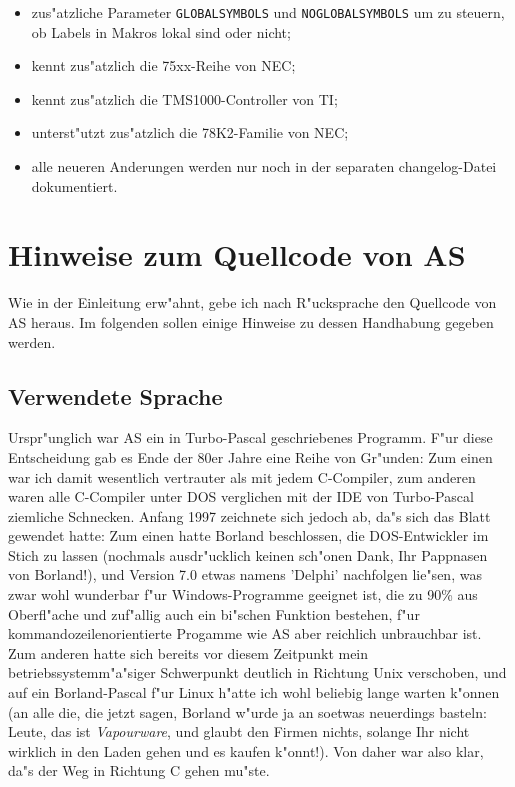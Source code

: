 \documentclass[12pt,a4paper,twoside]{report}
\newcommand{\tty}[1]{{\tt #1}}
\newcommand{\asname}{AS}
\begin{document}
\begin{itemize}
{\begin{itemize}
      \item{zus"atzliche Parameter \tty{GLOBALSYMBOLS} und
            \tty{NOGLOBALSYMBOLS} um zu steuern, ob Labels
            in Makros lokal sind oder nicht;}
      \item{kennt zus"atzlich die 75xx-Reihe von NEC;}
      \item{kennt zus"atzlich die TMS1000-Controller von TI;}
      \item{unterst"utzt zus"atzlich die 78K2-Familie von NEC;}
      \item{alle neueren Anderungen werden nur noch in der
            separaten changelog-Datei dokumentiert.}
      \end{itemize}}
\end{itemize}


\cleardoublepage
\chapter{Hinweise zum Quellcode von \asname{}}
\label{ChapSource}

Wie in der Einleitung erw"ahnt, gebe ich nach R"ucksprache den Quellcode
von \asname{} heraus.  Im folgenden sollen einige Hinweise zu dessen Handhabung
gegeben werden.


\section{Verwendete Sprache}

Urspr"unglich war \asname{} ein in Turbo-Pascal geschriebenes Programm.  F"ur
diese Entscheidung gab es Ende der 80er Jahre eine Reihe von Gr"unden:
Zum einen war ich damit wesentlich vertrauter als mit jedem C-Compiler,
zum anderen waren alle C-Compiler unter DOS verglichen mit der IDE von
Turbo-Pascal ziemliche Schnecken.  Anfang 1997 zeichnete sich jedoch ab,
da"s sich das Blatt gewendet hatte: Zum einen hatte Borland beschlossen,
die DOS-Entwickler im Stich zu lassen (nochmals ausdr"ucklich keinen
sch"onen Dank, Ihr Pappnasen von Borland!), und Version 7.0 etwas namens
'Delphi' nachfolgen lie"sen, was zwar wohl wunderbar f"ur
Windows-Programme geeignet ist, die zu 90\% aus Oberfl"ache und zuf"allig
auch ein bi"schen Funktion bestehen, f"ur kommandozeilenorientierte
Progamme wie \asname{} aber reichlich unbrauchbar ist.  Zum anderen hatte sich
bereits vor diesem Zeitpunkt mein betriebssystemm"a"siger Schwerpunkt
deutlich in Richtung Unix verschoben, und auf ein Borland-Pascal f"ur
Linux h"atte ich wohl beliebig lange warten k"onnen (an alle die, die
jetzt sagen, Borland w"urde ja an soetwas neuerdings basteln: Leute, das
ist {\em Vapourware}, und glaubt den Firmen nichts, solange Ihr nicht
wirklich in den Laden gehen und es kaufen k"onnt!).  Von daher war also
klar, da"s der Weg in Richtung C gehen mu"ste.
\end{document}
